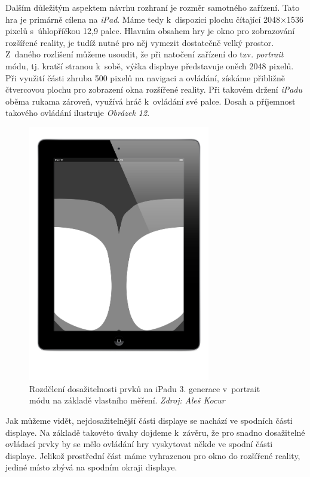 \documentclass[twoside,12pt]{article}
\begin{document}
Dalším důležitým aspektem návrhu rozhraní je rozměr samotného zařízení. Tato hra je primárně cílena na \textit{iPad}. Máme tedy k~dispozici plochu čítající 2048$\times$1536 pixelů s~úhlopříčkou 12,9 palce. Hlavním obsahem hry je okno pro zobrazování rozšířené reality, je tudíž nutné pro něj vymezit dostatečně velký prostor. Z~daného rozlišení můžeme usoudit, že při natočení zařízení do tzv. \textit{portrait} módu, tj. kratší stranou k~sobě, výška displaye představuje oněch 2048 pixelů. Při využití části zhruba 500 pixelů na navigaci a ovládání, získáme přibližně čtvercovou plochu pro zobrazení okna rozšířené reality. Při takovém držení \textit{iPadu} oběma rukama zároveň, využívá hráč k~ovládání své palce. Dosah a příjemnost takového ovládání ilustruje \textit{Obrázek 12}.

\begin{figure}[H]
\centering
    \includegraphics[width=300px, center]{images/ipad-toucharea.png}
\captionsetup{justification=centering}
    \caption[]{Rozdělení dosažitelnosti prvků na iPadu 3. generace v~portrait módu na základě vlastního měření. \textit{Zdroj: Aleš Kocur}}
    \label{class_diagram}
\end{figure}

Jak můžeme vidět, nejdosažitelnější části displaye se nachází ve spodních části displaye. Na základě takovéto úvahy dojdeme k~závěru, že pro snadno dosažitelné ovládací prvky by se mělo ovládání hry vyskytovat někde ve spodní části displaye. Jelikož prostřední část máme vyhrazenou pro okno do rozšířené reality, jediné místo zbývá na spodním okraji displaye. 
\end{document}
